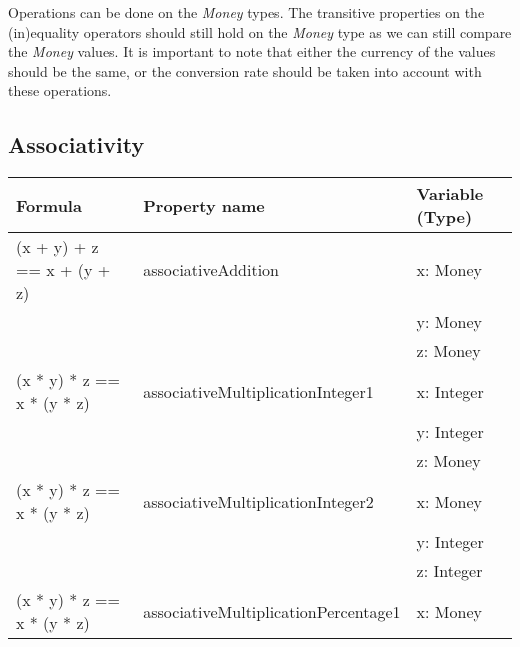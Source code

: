 \FloatBarrier
Operations can be done on the \textit{Money} types. The transitive properties \cite{raftery2011perspective} on the (in)equality operators should still hold on the \textit{Money} type as we can still compare the \textit{Money} values. It is important to note that either the currency of the values should be the same, or the conversion rate should be taken into account with these operations.

\subsection*{Associativity}
\label{ssct:4_associativity}
\FloatBarrier
\begin{table}[!ht]
\centering
\begin{tabular}{lll}
\hline
                        \textbf{Formula}           & \textbf{Property name}               & \textbf{Variable (Type)} \\ \hline
\rowcolor[HTML]{EFEFEF} (x + y) + z == x + (y + z) & associativeAddition                  & x: Money                 \\
\rowcolor[HTML]{EFEFEF}                            &                                      & y: Money                 \\
\rowcolor[HTML]{EFEFEF}                            &                                      & z: Money                 \\
                        (x * y) * z == x * (y * z) & associativeMultiplicationInteger1    & x: Integer               \\
                                                   &                                      & y: Integer               \\
                                                   &                                      & z: Money                 \\
\rowcolor[HTML]{EFEFEF} (x * y) * z == x * (y * z) & associativeMultiplicationInteger2    & x: Money                 \\
\rowcolor[HTML]{EFEFEF}                            &                                      & y: Integer               \\
\rowcolor[HTML]{EFEFEF}                            &                                      & z: Integer               \\
                        (x * y) * z == x * (y * z) & associativeMultiplicationPercentage1 & x: Money                 \\

\end{tabular}
\end{table}
